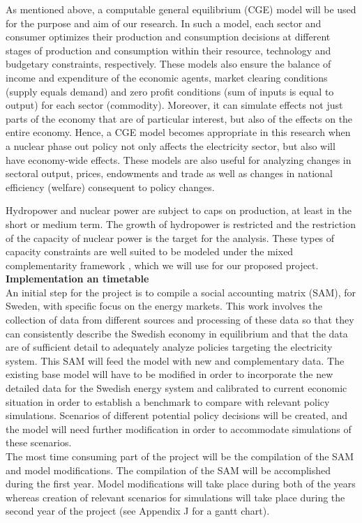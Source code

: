 As mentioned above, a computable general equilibrium (CGE) model will be used for the purpose and aim of our research. In such a model, each sector and consumer optimizes their production and consumption decisions at different stages of production and consumption within their resource, technology and budgetary constraints, respectively. These models also ensure the balance of income and expenditure of the economic agents, market clearing conditions (supply equals demand) and zero profit conditions (sum of inputs is equal to output) for each sector (commodity). Moreover, it can simulate effects not just parts of the economy that are of particular interest, but also of the effects on the entire economy. Hence, a CGE model becomes appropriate in this research when a nuclear phase out policy not only affects the electricity sector, but also will have economy-wide effects. These models are also useful for analyzing changes in sectoral output, prices, endowments and trade as well as changes in national efficiency (welfare) consequent to policy changes.

Hydropower and nuclear power are subject to caps on production, at least in the short or medium term. The growth of hydropower is restricted and the restriction of the capacity of nuclear power is the target for the analysis. These types of capacity constraints are well suited to be modeled under the mixed complementarity framework \citep{raey}, which we will use for our proposed project.\\
\textbf{Implementation an timetable}\\
An initial step for the project is to compile a social accounting matrix (SAM), for Sweden, with specific focus on the energy markets. This work involves the collection of data from different sources and processing of these data so that they can consistently describe the Swedish economy in equilibrium and that the data are of sufficient detail to adequately analyze policies targeting the electricity system. This SAM will feed the model with new and complementary data.
The existing base model will have to be modified in order to incorporate the new detailed data for the Swedish energy system and calibrated to current economic situation in order to establish a benchmark to compare with relevant policy simulations. Scenarios of different potential policy decisions will be created, and the model will need further modification in order to accommodate simulations of these scenarios.\\
The most time consuming part of the project will be the compilation of the SAM and model modifications. The compilation of the SAM will be accomplished during the first year. Model modifications will take place during both of the years whereas creation of relevant scenarios for simulations will take place during the second year of the project (see Appendix J for a gantt chart).\\

